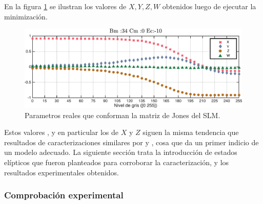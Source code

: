 En la figura \ref{fig:xyzw} se ilustran los valores de $X,Y,Z,W$ obtenidos luego de
ejecutar la minimización. 
\begin{figure}[h!]
\centering
\includegraphics[scale=.55]{xyzw.pdf}
\caption[Parametros reales que conforman la matriz de Jones del SLM]{Parametros reales que conforman la matriz de Jones del SLM.}
\label{fig:xyzw}
\end{figure}
Estos valores , y en particular los de $X$ y
$Z$ siguen la misma tendencia que resultados de caracterizaciones
similares por  y , cosa que
da un primer indicio de un modelo adecuado. 
La siguiente sección trata la introducción de estados elípticos que
fueron planteados para corroborar la caracterización, y los resultados
experimentales obtenidos. 

\subsubsection{Comprobación experimental}


